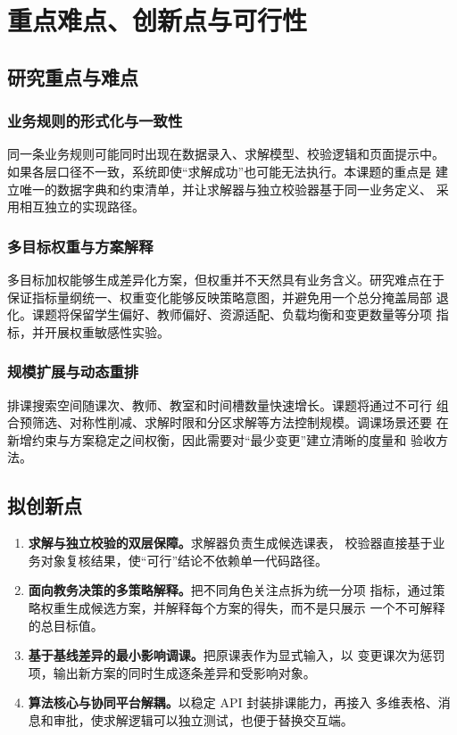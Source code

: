 \clearpage
\section{重点难点、创新点与可行性}

\subsection{研究重点与难点}

\subsubsection{业务规则的形式化与一致性}

同一条业务规则可能同时出现在数据录入、求解模型、校验逻辑和页面提示中。
如果各层口径不一致，系统即使“求解成功”也可能无法执行。本课题的重点是
建立唯一的数据字典和约束清单，并让求解器与独立校验器基于同一业务定义、
采用相互独立的实现路径。

\subsubsection{多目标权重与方案解释}

多目标加权能够生成差异化方案，但权重并不天然具有业务含义。研究难点在于
保证指标量纲统一、权重变化能够反映策略意图，并避免用一个总分掩盖局部
退化。课题将保留学生偏好、教师偏好、资源适配、负载均衡和变更数量等分项
指标，并开展权重敏感性实验。

\subsubsection{规模扩展与动态重排}

排课搜索空间随课次、教师、教室和时间槽数量快速增长。课题将通过不可行
组合预筛选、对称性削减、求解时限和分区求解等方法控制规模。调课场景还要
在新增约束与方案稳定之间权衡，因此需要对“最少变更”建立清晰的度量和
验收方法。

\subsection{拟创新点}

\begin{enumerate}
  \item \textbf{求解与独立校验的双层保障。}求解器负责生成候选课表，
  校验器直接基于业务对象复核结果，使“可行”结论不依赖单一代码路径。
  \item \textbf{面向教务决策的多策略解释。}把不同角色关注点拆为统一分项
  指标，通过策略权重生成候选方案，并解释每个方案的得失，而不是只展示
  一个不可解释的总目标值。
  \item \textbf{基于基线差异的最小影响调课。}把原课表作为显式输入，以
  变更课次为惩罚项，输出新方案的同时生成逐条差异和受影响对象。
  \item \textbf{算法核心与协同平台解耦。}以稳定 API 封装排课能力，再接入
  多维表格、消息和审批，使求解逻辑可以独立测试，也便于替换交互端。
\end{enumerate}


